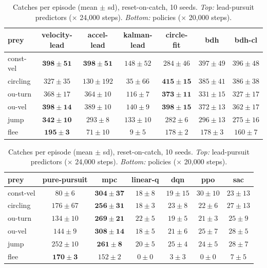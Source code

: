 \documentclass[11pt]{article}
\begin{document}
\begin{table}[t]
\centering
\caption{Catches per episode (mean $\pm$ sd), reset-on-catch, 10 seeds. \emph{Top:}
lead-pursuit predictors ($\times$ 24{,}000 steps). \emph{Bottom:} policies ($\times$
20{,}000 steps).}
\label{tab:results}
\small
\begin{tabular}{lcccccc}
\toprule
prey & velocity-lead & accel-lead & kalman-lead & circle-fit & bdh & bdh-cl \\
\midrule
const-vel & $\mathbf{398 \pm 51}$ & $\mathbf{398 \pm 51}$ & $148 \pm 52$ & $284 \pm 46$ & \emph{$397 \pm 49$} & $396 \pm 48$ \\
circling  & $327 \pm 35$ & $130 \pm 192$ & $35 \pm 66$ & $\mathbf{415 \pm 15}$ & $385 \pm 41$ & \emph{$386 \pm 38$} \\
ou-turn   & \emph{$368 \pm 17$} & $364 \pm 10$ & $116 \pm 7$ & $\mathbf{373 \pm 11}$ & $331 \pm 15$ & $327 \pm 17$ \\
ou-vel    & $\mathbf{398 \pm 14}$ & \emph{$389 \pm 10$} & $140 \pm 9$ & $\mathbf{398 \pm 15}$ & $372 \pm 13$ & $362 \pm 17$ \\
jump      & $\mathbf{342 \pm 10}$ & $293 \pm 8$ & $133 \pm 10$ & $282 \pm 6$ & \emph{$296 \pm 13$} & $275 \pm 16$ \\
flee      & $\mathbf{195 \pm 3}$ & $71 \pm 10$ & $9 \pm 5$ & \emph{$178 \pm 2$} & \emph{$178 \pm 3$} & $160 \pm 7$ \\
\bottomrule
\end{tabular}

\bigskip

\begin{tabular}{lcccccc}
\toprule
prey & pure-pursuit & mpc & linear-q & dqn & ppo & sac \\
\midrule
const-vel & \emph{$80 \pm 6$} & $\mathbf{304 \pm 37}$ & $18 \pm 8$ & $19 \pm 15$ & $30 \pm 10$ & $23 \pm 13$ \\
circling  & \emph{$176 \pm 67$} & $\mathbf{256 \pm 31}$ & $18 \pm 3$ & $23 \pm 8$ & $22 \pm 6$ & $27 \pm 13$ \\
ou-turn   & \emph{$134 \pm 10$} & $\mathbf{269 \pm 21}$ & $22 \pm 5$ & $19 \pm 5$ & $21 \pm 3$ & $25 \pm 9$ \\
ou-vel    & \emph{$144 \pm 9$} & $\mathbf{308 \pm 14}$ & $18 \pm 5$ & $21 \pm 6$ & $25 \pm 7$ & $28 \pm 5$ \\
jump      & \emph{$252 \pm 10$} & $\mathbf{261 \pm 8}$ & $20 \pm 5$ & $25 \pm 4$ & $24 \pm 5$ & $28 \pm 7$ \\
flee      & $\mathbf{170 \pm 3}$ & \emph{$152 \pm 2$} & $0 \pm 0$ & $3 \pm 3$ & $0 \pm 0$ & $7 \pm 5$ \\
\bottomrule
\end{tabular}
\end{table}
\end{document}

